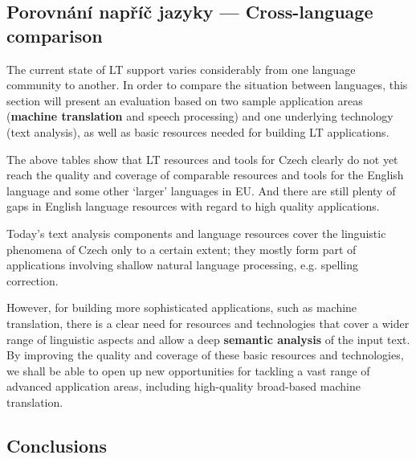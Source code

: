 \documentclass[]{../../metanetpaper}
\begin{document}
\begin{multicols}{2}
\subsection{Porovnání napříč jazyky --- Cross-language comparison}
    The current state of LT support varies considerably from one language community to another. In order to compare the situation between languages, this section will present an evaluation based on two sample application areas (\textbf{machine translation} and speech processing) and one underlying technology (text analysis), as well as basic resources needed for building LT applications.

The above tables show that LT resources and tools for Czech clearly do not yet reach the quality and coverage of comparable resources and tools for the English language and some other ‘larger’ languages in EU. And there are still plenty of gaps in English language resources with regard to high quality applications.

Today’s text analysis components and language resources cover the linguistic phenomena of Czech only to a certain extent; they mostly form part of applications involving shallow natural language processing, e.g. spelling correction.

However, for building more sophisticated applications, such as machine translation, there is a clear need for resources and technologies that cover a wider range of linguistic aspects and allow a deep \textbf{semantic analysis} of the input text. By improving the quality and coverage of these basic resources and technologies, we shall be able to open up new opportunities for tackling a vast range of advanced application areas, including high-quality broad-based machine translation.

\subsection{Conclusions}


\end{multicols}
\end{document}
